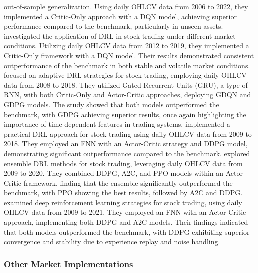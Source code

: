 out-of-sample generalization. Using daily OHLCV data from 2006 to 2022, they implemented a Critic-Only approach with a DQN model, achieving superior performance compared to the benchmark, particularly in unseen assets. \cite{theate_application_2021} investigated the application of DRL in stock trading under different market conditions. Utilizing daily OHLCV data from 2012 to 2019, they implemented a Critic-Only framework with a DQN model. Their results demonstrated consistent outperformance of the benchmark in both stable and volatile market conditions. \cite{wu_adaptive_2020} focused on adaptive DRL strategies for stock trading, employing daily OHLCV data from 2008 to 2018. They utilized Gated Recurrent Units (GRU), a type of RNN, with both Critic-Only and Actor-Critic approaches, deploying GDQN and GDPG models. The study showed that both models outperformed the benchmark, with GDPG achieving superior results, once again highlighting the importance of time-dependent features in trading systems. \cite{xiong_practical_2018} implemented a practical DRL approach for stock trading using daily OHLCV data from 2009 to 2018. They employed an FNN with an Actor-Critic strategy and DDPG model, demonstrating significant outperformance compared to the benchmark. \cite{yang_deep_2020} explored ensemble DRL methods for stock trading, leveraging daily OHLCV data from 2009 to 2020. They combined DDPG, A2C, and PPO models within an Actor-Critic framework, finding that the ensemble significantly outperformed the benchmark, with PPO showing the best results, followed by A2C and DDPG. \cite{yousefi_deep_2022} examined deep reinforcement learning strategies for stock trading, using daily OHLCV data from 2009 to 2021. They employed an FNN with an Actor-Critic approach, implementing both DDPG and A2C models. Their findings indicated that both models outperformed the benchmark, with DDPG exhibiting superior convergence and stability due to experience replay and noise handling.

\subsubsection{Other Market Implementations}

